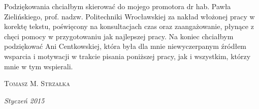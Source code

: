 Podziękowania chciałbym skierować do mojego promotora dr hab. Pawła Zielińskiego, prof. nadzw. Politechniki Wrocławskiej za nakład włożonej pracy w korektę tekstu, poświęcony na konsultacjach czas oraz zaangażowanie, płynące z chęci pomocy w przygotowaniu jak najlepszej pracy. Na koniec chciałbym podziękować Ani Centkowskiej, która była dla mnie niewyczerpanym źródłem wsparcia i motywacji w trakcie pisania poniższej pracy, jak i wszystkim, którzy mnie w tym wspierali.

\textsc{Tomasz M. Strzałka}

\textit{Styczeń 2015}
